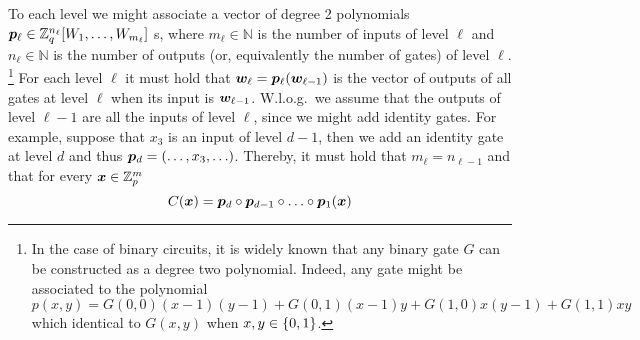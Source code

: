 To each level we might associate a vector of degree 2 polynomials ${\boldsymbol{p}}_\ell \in \mathbb{Z}_q^{n_\ell}[W_1,\ldots,W_{m_\ell}]$ s, where $m_\ell\in\mathbb{N}$ is the number of inputs of level $\ell$ and $n_\ell\in\mathbb{N}$ is the number of outputs (or, equivalently the number of gates) of level $\ell$. \footnote{In the case of binary circuits, it is widely known that any binary gate $G$ can be constructed as a degree two polynomial. Indeed, any gate might be associated to the polynomial $p(x,y) = G(0,0)(x-1)(y-1)+G(0,1)(x-1)y+G(1,0)x(y-1)+G(1,1)xy$ which identical to $G(x,y)$ when $x,y\in\{0,1\}$.}
For each level $\ell$ it must hold that ${\boldsymbol{w}}_\ell={\boldsymbol{p}}_\ell({\boldsymbol{w}}_{\ell-1})$ is the vector of outputs of all gates at level $\ell$ when its input is ${\boldsymbol{w}}_{\ell-1}$.
W.l.o.g.~we assume that the outputs of level $\ell-1$ are all the inputs of level $\ell$, since we might add identity gates. For example, suppose that $x_3$ is an input of level $d-1$, then we add an identity gate at level $d$ and thus ${\boldsymbol{p}}_d=(\ldots,x_3,\ldots)$.
 Thereby, it must hold that $ m_\ell = n_{\ell-1}$ and that for every ${\boldsymbol{x}}\in\mathbb{Z}_p^m$
$$
C({\boldsymbol{x}}) = {\boldsymbol{p}}_{d}\circ{\boldsymbol{p}}_{d-1}\circ\ldots\circ {\boldsymbol{p}}_1 ({\boldsymbol{x}})
$$

